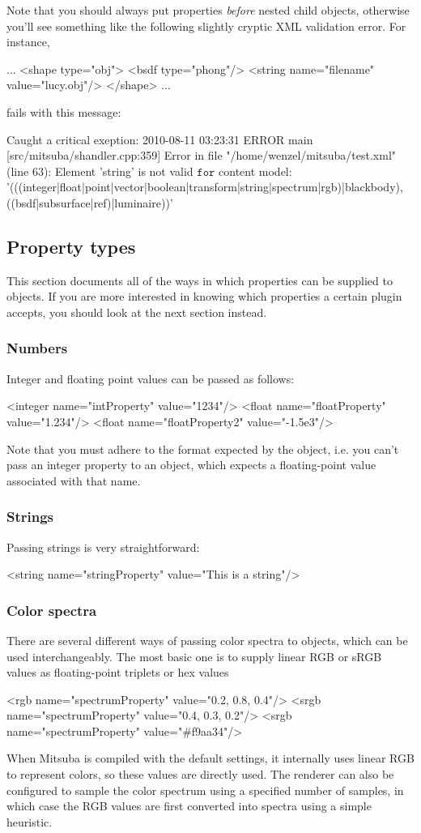 Note that you should always put properties \emph{before} nested child objects, otherwise you'll see something like the following slightly cryptic
 XML validation error. For instance,
\begin{xml}
...
	<shape type="obj">
		<bsdf type="phong"/>
		<string name="filename" value="lucy.obj"/>
	</shape>
...
\end{xml}
fails with this message:
\begin{shell}
Caught a critical exeption: 2010-08-11 03:23:31 ERROR main [src/mitsuba/shandler.cpp:359] Error in file "/home/wenzel/mitsuba/test.xml" (line 63): Element 'string' is not valid $\texttt{for}$ content model: '(((integer|float|point|vector|boolean|transform|string|spectrum|rgb)|blackbody),((bsdf|subsurface|ref)|luminaire))'
\end{shell}
\subsection{Property types}
This section documents all of the ways in which properties can be supplied to objects. If you are more
interested in knowing which properties a certain plugin accepts, you should look at the next section instead.
\subsubsection{Numbers}
Integer and floating point values can be passed as follows:
\begin{xml}
<integer name="intProperty" value="1234"/>
<float name="floatProperty" value="1.234"/>
<float name="floatProperty2" value="-1.5e3"/>
\end{xml}
Note that you must adhere to the format expected by the object, i.e. you can't pass an integer property
to an object, which expects a floating-point value associated with that name.
\subsubsection{Strings}
Passing strings is very straightforward:
\begin{xml}
<string name="stringProperty" value="This is a string"/>
\end{xml}
\subsubsection{Color spectra}
There are several different ways of passing color spectra to objects, which can be used interchangeably.
The most basic one is to supply linear RGB or sRGB values as floating-point triplets or hex values
\begin{xml}
<rgb name="spectrumProperty" value="0.2, 0.8, 0.4"/>
<srgb name="spectrumProperty" value="0.4, 0.3, 0.2"/>
<srgb name="spectrumProperty" value="#f9aa34"/>
\end{xml}
When Mitsuba is compiled with the default settings, it internally uses linear RGB to represent colors, so
these values are directly used. The renderer can also be configured to sample the color spectrum using a specified
number of samples, in which case the RGB values are first converted into spectra using a simple heuristic.

